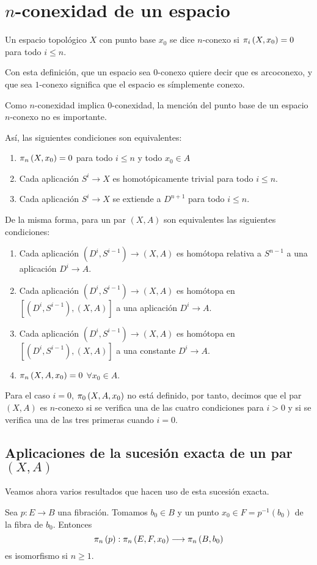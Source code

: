 \section{$n$-conexidad de un espacio}
\begin{defin}
Un espacio topológico $X$ con punto base $x_0$ se dice $n$-conexo si $\pi_{i}\left(X, x_0\right) = 0$ para todo $i \leq n$.
\end{defin}
Con esta definición, que un espacio sea $0$-conexo quiere decir que es arcoconexo, y que sea $1$-conexo significa que el espacio es símplemente conexo. \par
Como $n$-conexidad implica $0$-conexidad, la mención del punto base de un espacio $n$-conexo no es importante. \par
Así, las siguientes condiciones son equivalentes:
\begin{enumerate}
\item $\pi_{n}\left(X, x_0\right) = 0$ para todo $i \leq n$ y todo $x_0 \in A$
\item Cada aplicación $S^i \longrightarrow X$ es homotópicamente trivial para todo $i \leq n$.
\item Cada aplicación $S^i \longrightarrow X$ se extiende a $D^{n+1}$ para todo $i \leq n$.
\end{enumerate}
De la misma forma, para un par $(X, A)$ son equivalentes las siguientes condiciones:
\begin{enumerate}
\item Cada aplicación $(D^i, S^{i-1}) \longrightarrow (X, A)$ es homótopa relativa a $S^{n-1}$ a una aplicación $D^i \longrightarrow A$.
\item Cada aplicación $(D^i, S^{i-1}) \longrightarrow (X, A)$ es homótopa en $[(D^i, S^{i-1}), (X, A)]$ a una aplicación $D^i \longrightarrow A$.
\item Cada aplicación $(D^i, S^{i-1}) \longrightarrow (X, A)$ es homótopa en $[(D^i, S^{i-1}), (X, A)]$ a una constante $D^i \longrightarrow A$.
\item $\pi_{n}\left(X, A, x_0\right) = 0$ $\forall x_0 \in A$.
\end{enumerate}
Para el caso $i = 0$, $\pi_{0}\left(X, A, x_0\right)$ no está definido, por tanto, decimos que el par $(X, A)$ es $n$-conexo si se verifica una de las cuatro condiciones para $i > 0$ y si se verifica una de las tres primeras cuando $i=0$.

\subsection*{Aplicaciones de la sucesión exacta de un par $(X,A)$}
Veamos ahora varios resultados que hacen uso de esta sucesión exacta.
\begin{teor}
Sea $p : E \longrightarrow B$ una fibración. Tomamos $b_0 \in B$ y un punto $x_0 \in F = p^{-1}(b_0)$ de la fibra de $b_0$. Entonces
\[
\homot{n}{p} : \homot{n}{E, F, x_0} \longrightarrow \homot{n}{B, b_0}
\]
es isomorfismo si $n \geq 1$.
\end{teor}